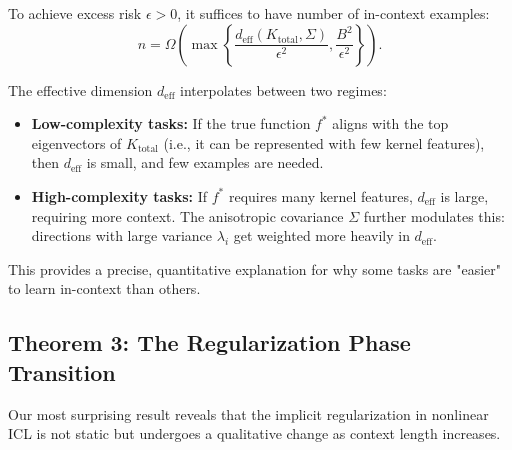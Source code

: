 	\begin{corollary}
		\label{cor:sample_complexity}
		To achieve excess risk \(\epsilon > 0\), it suffices to have number of in-context examples:
		\begin{equation}
			n = \Omega\left( \max\left\{ \frac{d_{\text{eff}}(K_{\text{total}}, \Sigma)}{\epsilon^2}, \frac{B^2}{\epsilon^2} \right\} \right).
		\end{equation}
	\end{corollary}
	
	\begin{remark}
		The effective dimension \(d_{\text{eff}}\) interpolates between two regimes:
		\begin{itemize}
			\item \textbf{Low-complexity tasks:} If the true function \(f^*\) aligns with the top eigenvectors of \(K_{\text{total}}\) (i.e., it can be represented with few kernel features), then \(d_{\text{eff}}\) is small, and few examples are needed.
			\item \textbf{High-complexity tasks:} If \(f^*\) requires many kernel features, \(d_{\text{eff}}\) is large, requiring more context. The anisotropic covariance \(\Sigma\) further modulates this: directions with large variance \(\lambda_i\) get weighted more heavily in \(d_{\text{eff}}\).
		\end{itemize}
		This provides a precise, quantitative explanation for why some tasks are "easier" to learn in-context than others.
	\end{remark}
	
	\subsection{Theorem 3: The Regularization Phase Transition}
	\label{subsec:thm3}
	
	Our most surprising result reveals that the implicit regularization in nonlinear ICL is not static but undergoes a qualitative change as context length increases.
	
